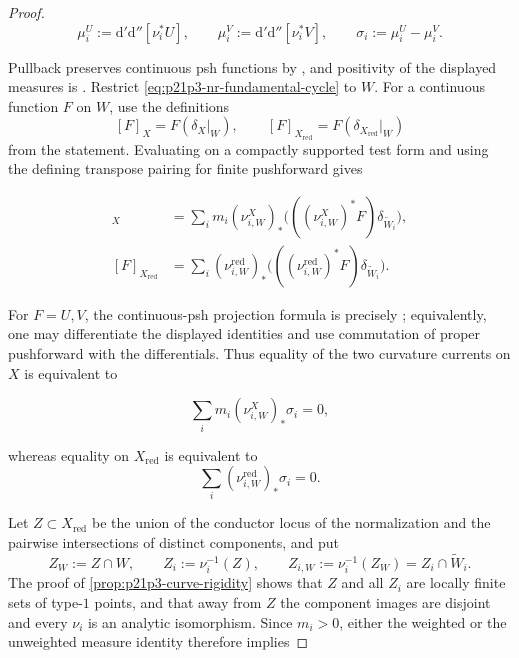 \begin{proof}
\[
 \mu_i^U:=\mathrm d'\mathrm d''[\nu_i^*U],
 \qquad
 \mu_i^V:=\mathrm d'\mathrm d''[\nu_i^*V],
 \qquad
 \sigma_i:=\mu_i^U-\mu_i^V.
\]

Pullback preserves continuous psh functions by
\cite[Proposition~8.1.5]{CLD25}, and positivity of the displayed measures
is \cite[Lemma~8.5.5]{CLD25}.  Restrict
\eqref{eq:p21p3-nr-fundamental-cycle} to \(W\).  For a continuous function
\(F\) on \(W\), use the definitions
\[
 [F]_X=F(\delta_X|_W),\qquad
 [F]_{X_{\mathrm{red}}}=F(\delta_{X_{\mathrm{red}}}|_W)
\]
from the statement.  Evaluating on a compactly supported test form and using
the defining transpose pairing for finite pushforward gives

\begin{align}
 [F]_X
   &=\sum_i m_i(\nu_{i,W}^{X})_*
       \bigl(((\nu_{i,W}^{X})^*F)\delta_{\widetilde W_i}\bigr),
 \label{eq:p21p3-nr-function-current-X}\\
 [F]_{X_{\mathrm{red}}}
   &=\sum_i(\nu_{i,W}^{\mathrm{red}})_*
       \bigl(((\nu_{i,W}^{\mathrm{red}})^*F)
                    \delta_{\widetilde W_i}\bigr).
 \label{eq:p21p3-nr-function-current-red}
\end{align}

For \(F=U,V\), the continuous-psh projection formula is precisely
\cite[Proposition~8.5.6]{CLD25}; equivalently, one may differentiate the
displayed identities and use commutation of proper pushforward with the
differentials.  Thus equality of the two curvature currents on \(X\) is
equivalent to

\begin{equation}
\label{eq:p21p3-nr-weighted-measure-sum}
                       \sum_i m_i(\nu_{i,W}^{X})_*\sigma_i=0,
\end{equation}

whereas equality on \(X_{\mathrm{red}}\) is equivalent to
\[
                       \sum_i
                         (\nu_{i,W}^{\mathrm{red}})_*\sigma_i=0.
\]

Let \(Z\subset X_{\mathrm{red}}\) be the union of the conductor locus of
the normalization and the pairwise intersections of distinct components,
and put
\[
 Z_W:=Z\cap W,
 \qquad
 Z_i:=\nu_i^{-1}(Z),
 \qquad
 Z_{i,W}:=\nu_i^{-1}(Z_W)=Z_i\cap\widetilde W_i.
\]
The proof of
\cref{prop:p21p3-curve-rigidity} shows that \(Z\) and all \(Z_i\) are
locally finite sets of type-\(1\) points, and that away from \(Z\) the
component images are disjoint and every \(\nu_i\) is an analytic
isomorphism.  Since \(m_i>0\), either the weighted or the unweighted
measure identity therefore implies


\end{proof}
